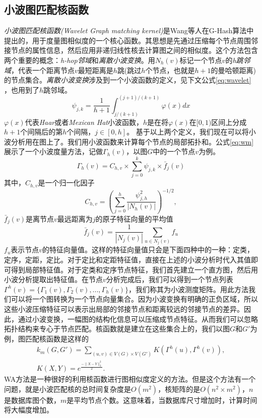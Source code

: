 \documentclass{XDBAthesis}
\begin{document}
\subsection{小波图匹配核函数}
\emph{小波图匹配核函数(Wavelet Graph matching kernel)}\cite{ghash}是Wang等人在G-Hash算法中提出的，用于度量图相似度的一个核心函数。其思想是先通过压缩每个节点周围邻接节点的属性信息，然后应用非递归线性核去计算图之间的相似度。这个方法包含两个重要的概念：\emph{h-hop邻域}和\emph{离散小波变换}。用$N_h (v)$标记一个节点$v$的\emph{h跳邻域}，代表一个距离节点$v$最短距离是$h$跳(跳过$h$个节点，也就是$h+1$的曼哈顿距离)的节点集合。\emph{离散小波变换}涉及到一个小波函数的定义，见下文公式\eqref{eq:wavelet} ，也用到了$h$跳邻域。
\begin{equation}
    \psi_{j,k}=\frac{1}{h+1}\int_{j/(k+1)}^{(j+1)/(k+1)}\varphi(x)dx
    \label{eq:wavelet}
\end{equation}
$\varphi(x)$代表\emph{Haar}或者\emph{Mexican Hat}小波函数，$h$是在将$\varphi(x)$在$[0,1)$区间上分成$h+1$个间隔后的第$h$个间隔，$j\in[0,h]$。
基于以上两个定义，我们现在可以将小波分析用在图上了。我们用小波函数来计算每个节点的局部拓扑和。公式\eqref{eq:wm}展示了一个小波度量方法，记做$\Gamma_h (v)$，以图$G$中的一个节点$v$为例。
\begin{equation}
    \Gamma_h (v)=C_{h,v}\times\sum_{j=0}^k \psi_{j,k}\times\bar{f}_j (v)
    \label{eq:wm}
\end{equation}
其中，$C_{h,v}$是一个归一化因子
\begin{equation}
    C_{h,v}=(\sum_{j=0}^h \frac{\psi_{j,h}^2 }{|N_h (v)|})^{-1/2},
\end{equation}
$\bar{f}_{j}(v)$是离节点$v$最远距离为$j$的原子特征向量的平均值
\begin{equation}
    \bar{f}_{j}(v)=\frac{1}{|N_{j}(v)|}\sum_{u\in N_{j}(v)}f_u
\end{equation}
$f_u $表示节点$v$的特征向量值。这样的特征向量值只会是下面四种中的一种：定类，定序，定距，定比。对于定比和定距特征值，直接在上述的小波分析时代入其值即可得到局部特征值。对于定类和定序节点特征，我们首先建立一个直方图，然后用小波分析提取出特征值。在节点$v$分析完成后，我们可以得到一个节点列表$\Gamma^h (v)=\{\Gamma_{1}(v),\Gamma_{2}(v),...,\Gamma_{h}(v)\}$，我们称其为小波测度矩阵。用此方法我们可以将一个图转换为一个节点向量集合。因为小波变换有明确的正负区域，所以这些小波压缩特征可以表示出局部的邻接节点和距离较远的邻接节点的差异。因此，通过小波变换，一幅图的结构化信息可以压缩成节点特征。从而我们可以忽略拓扑结构来专心于节点匹配。核函数就是建立在这些集合上的，我们以图$G$和$G'$为例，图匹配核函数是这样的
\begin{gather}
    k_{m}(G,G')=\sum_{(u,v)\in V(G)\times V(G')}K(\Gamma^{h}(u),\Gamma^h (v) ), \\
    K(X,Y)=e^{\frac{-\|X-Y\|_{2}^{2}}{2}}.
\end{gather}
WA方法是一种很好的利用核函数进行图相似度定义的方法。但是这个方法有一个问题，就是小波匹配核的总时间复杂度是$O(m^2 )$，核矩阵的是$O(n^2 \times m^2 )$，$n$是数据库图个数，$m$是平均节点个数。这意味着，当数据库尺寸增加时，计算时间将大幅度增加。
\end{document}

